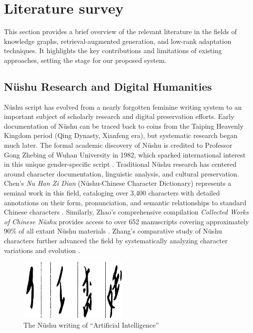 \documentclass{article}
\begin{document}
\section{Literature survey}
\label{sec:lite}
    This section provides a brief overview of the relevant literature in the fields of knowledge graphs, retrieval-augmented generation, and low-rank adaptation techniques. It highlights the key contributions and limitations of existing approaches, setting the stage for our proposed system.

\subsection{N\"{u}shu Research and Digital Humanities}
\label{ssec:nushu_dh}
    N\"{u}shu script has evolved from a nearly forgotten feminine writing system to an important subject of scholarly research and digital preservation efforts. Early documentation of N\"{u}shu can be traced back to coins from the Taiping Heavenly Kingdom period (Qing Dynasty, Xianfeng era), but systematic research began much later. The formal academic discovery of N\"{u}shu is credited to Professor Gong Zhebing of Wuhan University in 1982, which sparked international interest in this unique gender-specific script \cite{zhao2005nushu}.
    Traditional N\"{u}shu research has centered around character documentation, linguistic analysis, and cultural preservation. Chen's \textit{Nu Han Zi Dian} (N\"{u}shu-Chinese Character Dictionary) represents a seminal work in this field, cataloging over 3,400 characters with detailed annotations on their form, pronunciation, and semantic relationships to standard Chinese characters \cite{chen2006nuhanzi}. Similarly, Zhao's comprehensive compilation \textit{Collected Works of Chinese N\"{u}shu} provides access to over 652 manuscripts covering approximately 90\% of all extant N\"{u}shu materials \cite{zhao2005nushu}. Zhang's comparative study of N\"{u}shu characters further advanced the field by systematically analyzing character variations and evolution \cite{zhang2006nushu}.
    
    \begin{figure}[htb]
    \centering
    \includegraphics[width=0.48\textwidth]{images/AI_in_nvshu.png}
    \caption{The Nüshu writing of “Artificial Intelligence”}
    \label{fig:ai_in_nvshu}
    \end{figure}
\end{document}
